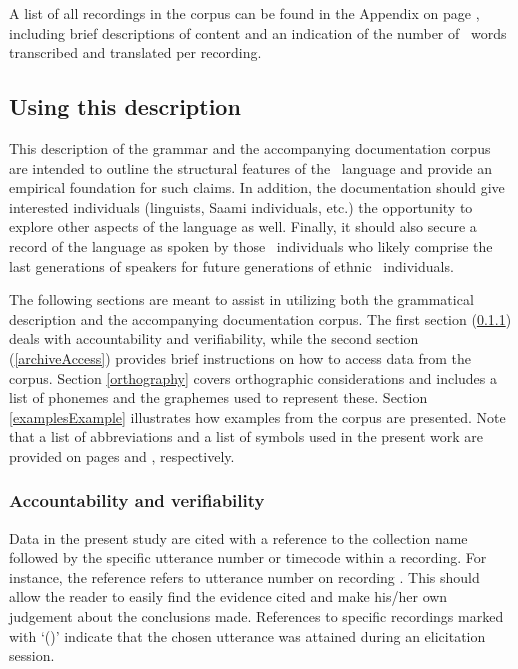  A list of all recordings in the corpus can be found in the Appendix on page \pageref{inventory}, including brief descriptions of content and an indication of the number of \PS\ words transcribed and translated per recording. 




\subsection{Using this description}\label{usingThis}  
This description of the grammar and the accompanying documentation corpus are intended to outline the structural features of the \PS\ language and provide an empirical foundation for such claims. In addition, the documentation should give interested individuals (linguists, Saami individuals, etc.) the opportunity to explore other aspects of the language as well. Finally, it should also secure a record of the language as spoken by those \PS\ individuals who likely comprise the last generations of speakers for future generations of ethnic \PS\ individuals. 

The following sections are meant to assist in utilizing both the grammatical description and the accompanying documentation corpus. 
The first section (\ref{accountabilityEtc}) deals with accountability and verifiability, while the second section (\ref{archiveAccess}) provides brief instructions on how to access data from the corpus. 
Section \ref{orthography} covers orthographic considerations and includes a list of phonemes and the graphemes used to represent these.  
Section \ref{examplesExample} illustrates how examples from the corpus are presented. %
Note that a list of abbreviations and a list of symbols used in the present work are provided on pages \pageref{abbreviations} and \pageref{symbolList}, respectively. 


\subsubsection{Accountability and verifiability}\label{accountabilityEtc}
Data in the present study are cited with a reference to the collection name followed by the specific utterance number or timecode within a recording. For instance, the reference  refers to utterance number  on recording . %
This should allow the reader to easily find the evidence cited and make his/her own judgement about the conclusions made. References to specific recordings marked with ‘()’ indicate that the chosen utterance was attained during an elicitation session. 

